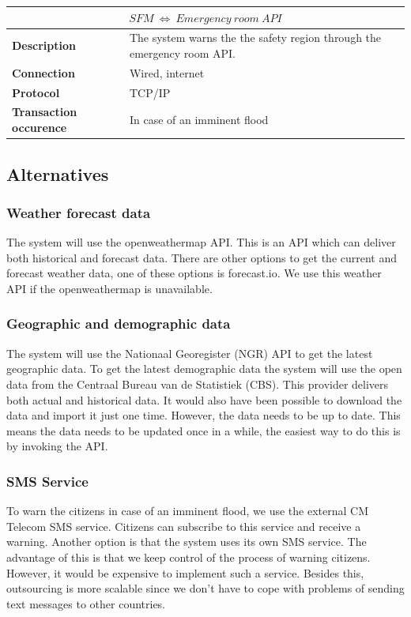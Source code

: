 \begin{table}[H]
	\centering
	\begin{tabular}{L{} L{}}
		\toprule
		 \\ \midrule
		\textbf{Description}           & The system warns the the safety region through the emergency room API. \\
		\textbf{Connection}            & Wired, internet                                                        \\
		\textbf{Protocol}              & TCP/IP                                                                 \\
		\textbf{Transaction occurence} & In case of an imminent flood                                           \\
		\bottomrule
	\end{tabular}
\end{table}


\subsection{Alternatives}
\label{subsec:system-alter}
\subsubsection*{Weather forecast data}
The system will use the openweathermap API. This is an API which can deliver both historical and forecast data. There are other options to get the current and forecast weather data, one of these options is forecast.io. We use this weather API if the openweathermap is unavailable. 

\subsubsection*{Geographic and demographic data}
The system will use the Nationaal Georegister (NGR) API to get the latest geographic data. To get the latest demographic data the system will use the open data from the Centraal Bureau van de Statistiek (CBS). This provider delivers both actual and historical data. It would also have been possible to download the data and import it just one time. However, the data needs to be up to date. This means the data needs to be updated once in a while, the easiest way to do this is by invoking the API.

\subsubsection*{SMS Service}
To warn the citizens in case of an imminent flood, we use the external CM Telecom SMS service. Citizens can subscribe to this service and receive a warning. Another option is that the system uses its own SMS service. The advantage of this is that we keep control of the process of warning citizens. However, it would be expensive to implement such a service. Besides this, outsourcing is more scalable since we don't have to cope with problems of sending text messages to other countries.

